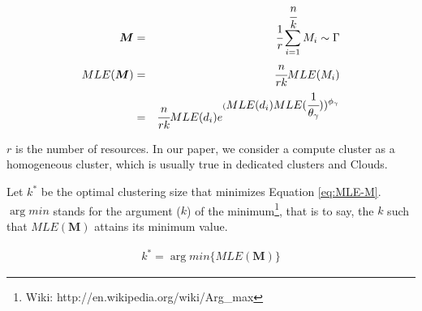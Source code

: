 \documentclass{IOS-Book-Article}
\begin{document}
\begin{eqnarray} 
\label{eq:MLE-M}
\bm{M}&=&\displaystyle\cfrac{1}{r}\sum_{i=1}^{\cfrac{n}{k}}M_i\sim\Gamma \nonumber\\
MLE(\bm{M})&=&\displaystyle\cfrac{n}{rk}MLE(M_i)\\
&=&\displaystyle\cfrac{n}{rk} MLE(d_i)e^{(\displaystyle MLE(d_i)MLE(\cfrac{1}{\theta_{\gamma}}))^{\phi_{\gamma}}} 
\end{eqnarray}

$r$ is the number of resources. In our paper, we consider a compute cluster as a homogeneous cluster, which is usually true in dedicated clusters and Clouds. 




Let $k^*$ be the optimal clustering size that minimizes Equation \ref{eq:MLE-M}.  $\arg min$  stands for the argument ($k$) of the minimum\footnote{Wiki: http://en.wikipedia.org/wiki/Arg\_max}, that is to say, the $k$ such that $MLE(\bm{M})$ attains its minimum value. 

\begin{eqnarray} 
\label{eq:k_optimal}
k^*=\arg min\{MLE(\bm{M})\} 
\end{eqnarray}
\end{document}
